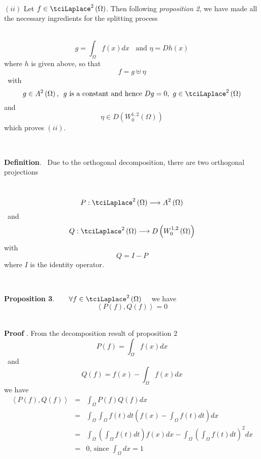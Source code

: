 \documentclass{amsproc}
\theoremstyle{plain}
\numberwithin{equation}{section}
\begin{document}
\ \ 

$(ii)$ Let $f\in \tciLaplace ^{2}\left( \Omega \right) $. Then following 
\textit{proposition 2}, we have made all the necessary ingredients for the
splitting process

\ \ \ 
\begin{equation*}
g=\int_{\Omega }f(x)dx\ \ \ \ \text{and \ \ \ \ \ \ }\eta =Dh(x)
\end{equation*}where $h$ is given above, so that\begin{equation*}
f=g\uplus \eta
\end{equation*}\ with 
\begin{equation*}
g\in A^{2}\left( \Omega \right) \text{,\ \ }g\text{ is a constant and hence }Dg=0,\text{ }g\in \tciLaplace ^{2}\left( \Omega \right)
\end{equation*}and 
\begin{equation*}
\eta \in D\left( W_{0}^{1,2}\left( \Omega \right) \right)
\end{equation*}which proves $(ii)$.

\ 

\textbf{Definition}. \ Due to the orthogonal decomposition, there are two
orthogonal projections

\ 
\begin{equation*}
P:\tciLaplace ^{2}\left( \Omega \right) \longrightarrow A^{2}\left( \Omega
\right)
\end{equation*}\ and 
\begin{equation*}
Q:\tciLaplace ^{2}\left( \Omega \right) \longrightarrow D\left(
W_{0}^{1,2}\left( \Omega \right) \right)
\end{equation*}with 
\begin{equation*}
Q=I-P
\end{equation*}where $I$ is the identity operator.

\ 

\textbf{Proposition 3}. \ \ $\ \ \forall f\in \tciLaplace ^{2}\left( \Omega
\right) $ \ \ we have \ \ 
\begin{equation*}
\left\langle P\left( f\right) ,Q\left( f\right) \right\rangle =0
\end{equation*}\ 

\textbf{Proof }. From the decomposition result of proposition 2 
\begin{equation*}
P(f)=\int_{\Omega }f(x)dx
\end{equation*}\ and 
\begin{equation*}
Q(f)=f(x)-\int_{\Omega }f(x)dx
\end{equation*}we have 
\begin{eqnarray*}
\left\langle P(f),Q(f)\right\rangle &=&\int_{\Omega }P(f)Q(f)dx \\
&=&\int_{\Omega }\int_{\Omega }f(t)dt\left( f(x)-\int_{\Omega }f(t)dt\right)
dx \\
&=&\int_{\Omega }\left( \int_{\Omega }f(t)dt\right) f(x)dx-\int_{\Omega
}\left( \int_{\Omega }f(t)dt\right) ^{2}dx \\
&=&0\text{, since }\int_{\Omega }dx=1
\end{eqnarray*}
\end{document}
